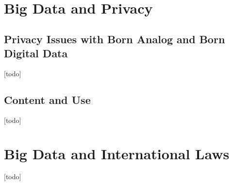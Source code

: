 \section{Big Data and Privacy}
\subsection{Privacy Issues with Born Analog and Born Digital Data}
[todo]

\subsection{Content and Use}
[todo]

\section{Big Data and International Laws}
[todo]
